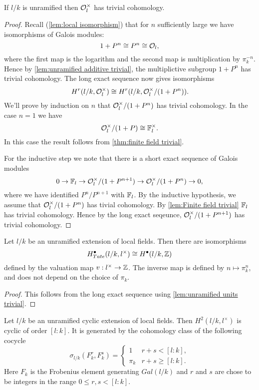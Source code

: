 \begin{lemma}	\label{lem:unramified units trivial}
	If $l/k$ is unramified then ${\mathcal O}_l^\times$ has trivial cohomology.
\end{lemma}

\begin{proof}
	Recall (\ref{lem:local isomorphism}) that for $n$ sufficiently large we have isomorphisms of
	Galois modules:
	\[
		1 + P^n \cong P^n \cong {\mathcal O}_l,
	\]
	where the first map is the logarithm and the second map is multiplication by $\pi_k^{-n}$.
	Hence by \ref{lem:unramified additive trivial}, the multiplictive subgroup $1+P^n$ has trivial
	cohomology.
	The long exact sequence now gives isomorphisms
	\[
		H^r(l/k,{\mathcal O}_l^\times) \cong H^r(l/k,{\mathcal O}_l^\times / (1+P^n)).
	\]
	We'll prove by induction on $n$ that ${\mathcal O}_l^\times / (1+P^n)$ has trivial cohomology.
	In the case $n = 1$ we have
	\[
		{\mathcal O}_l^\times / (1+P) \cong {\mathbb F}_l^\times.
	\]
	In this case the result follows from \ref{thm:finite field trivial}.

	For the inductive step we note that there is a short exact sequence of Galois modules
	\[
		0 \to {\mathbb F}_l \to  {\mathcal O}_l^\times / (1+P^{n+1})  \to{\mathcal O}_l^\times / (1+P^n)  \to  0,
	\]
	where we have identified $P^n / P^{n+1}$ with ${\mathbb F}_l$.
	By the inductive hypothesis, we assume that ${\mathcal O}_l^\times / (1+P^n)$ has tivial cohomology.
	By \ref{lem:Finite field trivial} ${\mathbb F}_l$ has trivial cohomology.
	Hence by the long exact seqeunce, ${\mathcal O}_l^\times / (1+P^{n+1})$ has trivial cohomology.
\end{proof}


\begin{corollary}
	Let $l/k$ be an unramified extension of local fields.
	Then there are isomorphisms
	\[
		H^\bullet_{Tate}(l/k,l^\times) \cong H^\bullet (l/k,{\mathbb Z})
	\]
	defined by the valuation map $v : l^\times \to {\mathbb Z}$.
	The inverse map is defined by $n \mapsto \pi_k^n$, and does not depend on the choice of $\pi_k$.
\end{corollary}

\begin{proof}
	This follows from the long exact sequence using \ref{lem:unramified units trivial}.
\end{proof}


\begin{lemma} \label{lem:unrammified fundamental class}
	Let $l/k$ be an unramified cyclic extension of local fields.
	Then $H^2(l/k,l^\times)$ is cyclic of order $[l:k]$.
	It is generated by the cohomology class of the following cocycle
	\[
		\sigma_{l/k} (F_k^r, F_k^s) =
		\begin{cases}
			1 & r + s < [l:k], \\
			\pi_k & r + s \ge [l:k].
		\end{cases}
	\]
	Here $F_k$ is the Frobenius element generating $Gal(l/k)$ and $r$ and $s$
	are chose to be integers in the range $0 \le r,s <[l:k]$.
\end{lemma}

